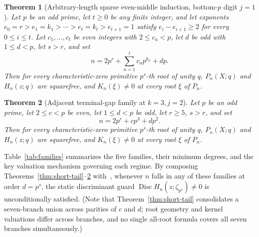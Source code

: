 \documentclass[11pt,reqno]{amsart}
\numberwithin{equation}{section}
\newtheorem{theorem}{Theorem}[section]
\theoremstyle{definition}
\theoremstyle{remark}
\newcommand{\Disc}{\operatorname{Disc}}
\begin{document}
\begin{theorem}[Arbitrary-length sparse even-middle induction, bottom-$p$ digit $j=1$]
\label{thm:sparse-bottom}
Let $p$ be an odd prime, let $t\ge 0$ be any finite integer, and let exponents $e_0=r > e_1=k_1 > \cdots > e_t=k_t > e_{t+1}=1$ satisfy $e_i - e_{i+1}\ge 2$ for every $0\le i\le t$. Let $c_1,\ldots,c_t$ be even integers with $2\le c_a<p$, let $d$ be odd with $1\le d<p$, let $s>r$, and set
\begin{equation}
\label{eq:n-sparse-bottom}
n = 2p^r + \sum_{a=1}^t c_a p^{k_a} + dp.
\end{equation}
Then for every characteristic-zero primitive $p^s$-th root of unity $q$, $P_n(X;q)$ and $H_n(z;q)$ are squarefree, and $K_n(\xi)\ne 0$ at every root $\xi$ of $P_n$.
\end{theorem}

\begin{theorem}[Adjacent terminal-gap family at $k=3,j=2$]
\label{thm:adjacent-k3}
Let $p$ be an odd prime, let $2\le c<p$ be even, let $1\le d<p$ be odd, let $r\ge 5$, $s>r$, and set
\begin{equation}
\label{eq:n-adj-k3}
n = 2p^r + cp^3 + dp^2.
\end{equation}
Then for every characteristic-zero primitive $p^s$-th root of unity $q$, $P_n(X;q)$ and $H_n(z;q)$ are squarefree, and $K_n(\xi)\ne 0$ at every root $\xi$ of $P_n$.
\end{theorem}

Table~\ref{tab:families} summarizes the five families, their minimum degrees, and the key valuation mechanism governing each regime. By composing Theorems~\ref{thm:short-tail}--\ref{thm:adjacent-k3} with~\cite[Theorem~1.1]{KKKKK26rs}, whenever $n$ falls in any of these families at order $d=p^s$, the static discriminant guard $\Disc H_n(z;\zeta_{p^s})\ne 0$ is unconditionally satisfied. (Note that Theorem~\ref{thm:short-tail} consolidates a seven-branch union across parities of $c$ and $d$; root geometry and kernel valuations differ across branches, and no single all-root formula covers all seven branches simultaneously.)
\end{document}
